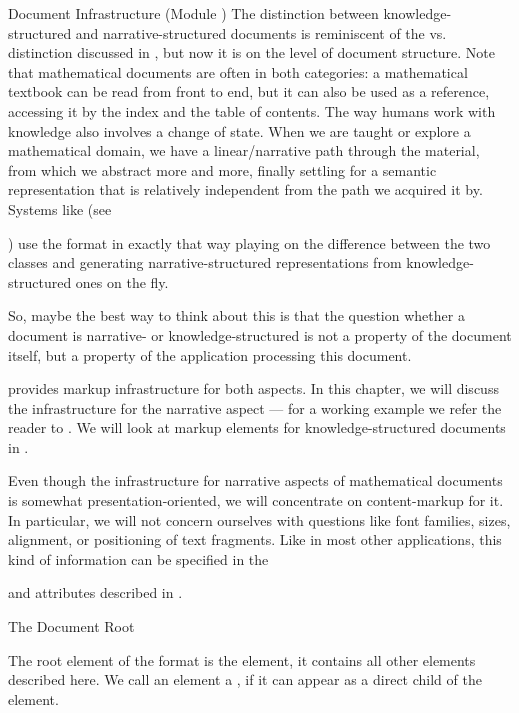 \begin{tchapter}[id=omdoc-infrastructure,short=Document Infrastructure]{Document Infrastructure (Module )}
The distinction between knowledge-structured and narrative-structured documents is
reminiscent of the  vs.  
distinction discussed in
, but now it is on the level of document structure.  Note that
mathematical documents are often in both categories: a mathematical textbook can be read
from front to end, but it can also be used as a reference, accessing it by the index and
the table of contents.  The way humans work with knowledge also involves a change of
state. When we are taught or explore a mathematical domain, we have a linear/narrative
path through the material, from which we abstract more and more, finally settling for a
semantic representation that is relatively independent from the path we acquired it by.
Systems like \activemath (see {) use the \omdoc format in
exactly that way playing on the difference between the two classes and generating
narrative-structured representations from knowledge-structured ones on the fly.

So, maybe the best way to think about this is that the question whether a document
is narrative- or knowledge-structured is not a property of the document itself,
but a property of the application processing this document.

\omdoc provides markup infrastructure for both aspects. In this chapter, we will discuss
the infrastructure for the narrative aspect --- for a working example we refer the reader
to . We will look at markup elements for knowledge-structured
documents in .

Even though the infrastructure for narrative aspects of mathematical documents is somewhat
presentation-oriented, we will concentrate on content-markup for it. In particular, we
will not concern ourselves with questions like font families, sizes, alignment, or
positioning of text fragments. Like in most other {\xml} applications, this kind of
information can be specified in the \css} { and
 attributes described in .

\begin{tsection}[id=root]{The Document Root}
  
  The {\xml} root element of the \omdoc format is the {} element, it
  contains all other elements described here. We call an \omdoc element a
  , if it can appear as a direct child of the
   element.
  

\end{tsection}}
\end{tchapter}
